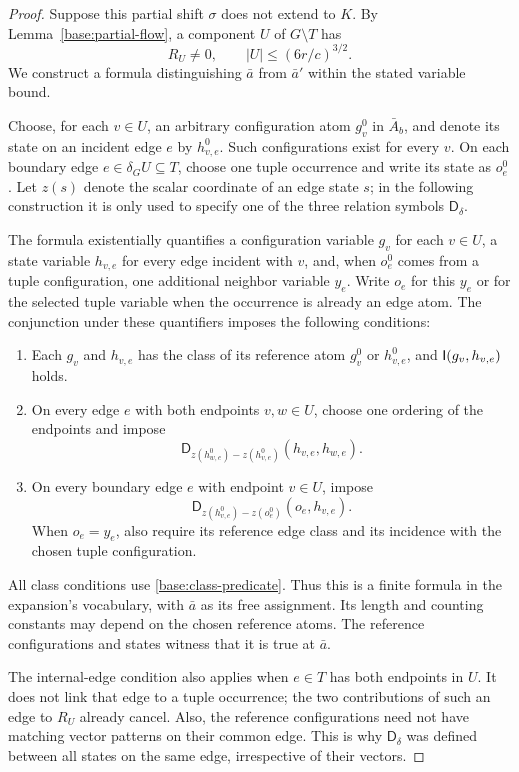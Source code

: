 \begin{proof}
Suppose this partial shift $\sigma$ does not extend to $K$.  By
Lemma~\ref{base:partial-flow}, a component $U$ of $G\setminus T$ has
\[
 R_U\ne0,\qquad |U|\le(6r/c)^{3/2}.
\]
We construct a formula distinguishing $\bar a$ from $\bar a'$ within
the stated variable bound.

Choose, for each $v\in U$, an arbitrary configuration atom $g_v^0$ in
$\bar A_b$, and denote its state on an incident edge $e$ by
$h_{v,e}^0$.  Such configurations exist for every $v$.  On each boundary
edge $e\in\delta_G U\subseteq T$, choose one tuple occurrence and
write its state as $o_e^0$.  Let $z(s)$ denote the scalar coordinate of
an edge state $s$; in the following construction it is only used to
specify one of the three relation symbols $\mathsf D_\delta$.

The formula existentially quantifies a configuration variable $g_v$
for each $v\in U$, a state variable $h_{v,e}$ for every edge incident
with $v$, and, when $o_e^0$ comes from a tuple configuration, one
additional neighbor variable $y_e$.  Write $o_e$ for this $y_e$ or for
the selected tuple variable when the occurrence is already an edge
atom.  The conjunction under these quantifiers imposes the following
conditions:
\begin{enumerate}
\item Each $g_v$ and $h_{v,e}$ has the class of its reference atom
      $g_v^0$ or $h_{v,e}^0$, and $\mathsf I(g_v,h_{v,e})$ holds.
\item On every edge $e$ with both endpoints $v,w\in U$, choose one
      ordering of the endpoints and impose
      \[
       \mathsf D_{z(h_{w,e}^0)-z(h_{v,e}^0)}
                (h_{v,e},h_{w,e}).
      \]
\item On every boundary edge $e$ with endpoint $v\in U$, impose
      \[
       \mathsf D_{z(h_{v,e}^0)-z(o_e^0)}(o_e,h_{v,e}).
      \]
      When $o_e=y_e$, also require its reference edge class and its
      incidence with the chosen tuple configuration.
\end{enumerate}
All class conditions use \eqref{base:class-predicate}.  Thus this is
a finite formula in the expansion's vocabulary, with $\bar a$ as
its free assignment.  Its length and counting constants may depend
on the chosen reference atoms.  The reference configurations and
states witness that it is true at $\bar a$.

The internal-edge condition also applies when $e\in T$ has both
endpoints in $U$.  It does not link that edge to a tuple occurrence;
the two contributions of such an edge to $R_U$ already cancel.  Also,
the reference configurations need not have matching vector patterns
on their common edge.  This is why $\mathsf D_\delta$ was defined
between all states on the same edge, irrespective of their vectors.


\end{proof}
